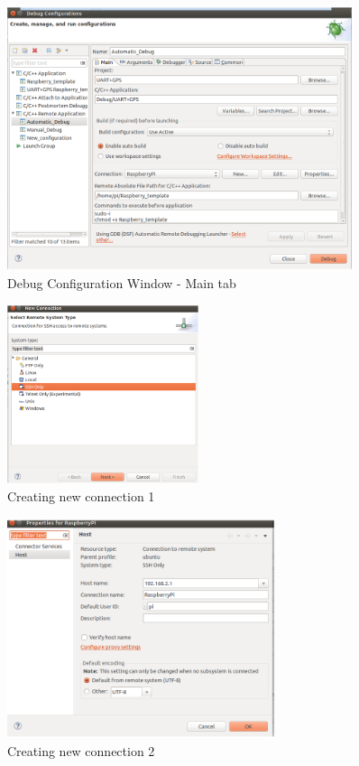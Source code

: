 \begin{figure}[H]
	\centering\includegraphics[width=0.9\textwidth]{fig/Debug2}
	\caption{Debug Configuration Window - Main tab}
	\label{fig:Debug2}
\end{figure}

\begin{figure}[H]
	\centering\includegraphics[width=0.5\textwidth]{fig/Debug3}
	\caption{Creating new connection 1}
	\label{fig:Debug3}
\end{figure}

\begin{figure}[H]
	\centering\includegraphics[width=0.7\textwidth]{fig/Debug4}
	\caption{Creating new connection 2}
	\label{fig:Debug4}
\end{figure}

